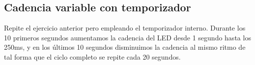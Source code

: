 \subsection{Cadencia variable con temporizador}

Repite el ejercicio anterior pero empleando el temporizador
interno. Durante los 10 primeros segundos aumentamos la cadencia
del LED desde 1 segundo hasta los 250ms, y en los últimos 10
segundos disminuimos la cadencia al mismo ritmo de tal forma
que el ciclo completo se repite cada 20 segundos.

\chapterend{}

